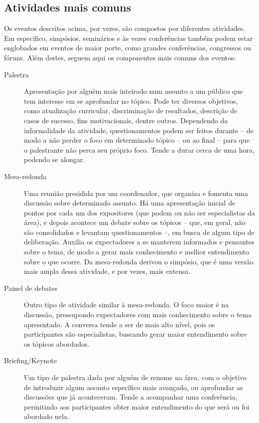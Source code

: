 \documentclass[12pt,a4paper,twoside,hyphens,english,brazil]{abntex2}
\begin{document}
\subsection{Atividades mais comuns}
Os eventos descritos acima, por vezes, são compostos por diferentes atividades. Em específico, simpósios, seminários e às vezes conferências também podem estar englobados em eventos de maior porte, como grandes conferências, congressos ou fóruns. Além destes, seguem aqui os componentes mais comuns dos eventos:
\begin{description}
	\item[Palestra] Apresentação por alguém mais inteirado num assunto a um público que tem interesse em se aprofundar no tópico. Pode ter diversos objetivos, como atualização curricular, discriminação de resultados, descrição de casos de sucesso, fins motivacionais, dentre outros. Dependendo da informalidade da atividade, questionamentos podem ser feitos durante -- de modo a não perder o foco em determinado tópico -- ou ao final -- para que o palestrante não perca seu próprio foco. Tende a durar cerca de uma hora, podendo se alongar. 

	\item[Mesa-redonda] Uma reunião presidida por um coordenador, que organiza e fomenta uma discussão sobre determinado assunto. Há uma apresentação inicial de pontos por cada um dos expositores (que podem ou não ser especialistas da área), e depois acontece um debate sobre os tópicos -- que, em geral, não são consolidados e levantam questionamentos --, em busca de algum tipo de deliberação. Auxilia os expectadores a se manterem informados e pensantes sobre o tema, de modo a gerar mais conhecimento e melhor entendimento sobre o que ocorre. Da mesa-redonda derivou o simpósio, que é uma versão mais ampla dessa atividade, e por vezes, mais extensa.

	\item[Painel de debates] Outro tipo de atividade similar à mesa-redonda. O foco maior é na discussão, pressupondo expectadores com mais conhecimento sobre o tema apresentado. A conversa tende a ser de mais alto nível, pois os participantes são especialistas, buscando gerar maior entendimento sobre os tópicos abordados.

	\item[Briefing/Keynote] Um tipo de palestra dada por alguém de renome na área, com o objetivo de introduzir algum assunto específico mais avançado, ou aprofundar as discussões que já aconteceram. Tende a acompanhar uma conferência, permitindo aos participantes obter maior entendimento do que será ou foi abordado nela.


\end{description}
\end{document}
